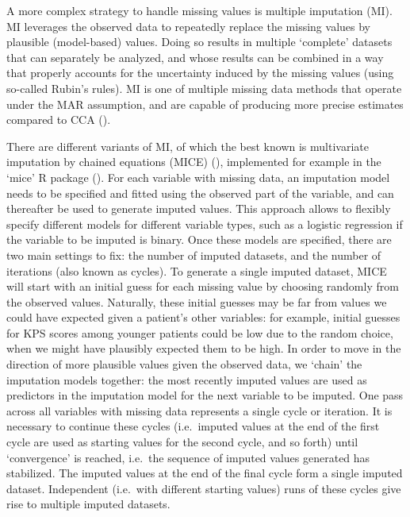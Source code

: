 \documentclass[
  letterpaper,
  paper=240mm:170mm,
  twoside=true,
  open=right,
  fontsize=10pt,
  pagesize=false,
  BCOR=15mm,
  DIV=14,
  headinclude=true,
  footinclude=false,
  headsepline=on]{scrbook}
\begin{document}
A more complex strategy to handle missing values is multiple imputation
(MI). MI leverages the observed data to repeatedly replace the missing
values by plausible (model-based) values. Doing so results in multiple
`complete' datasets that can separately be analyzed, and whose results
can be combined in a way that properly accounts for the uncertainty
induced by the missing values (using so-called Rubin's rules). MI is one
of multiple missing data methods that operate under the MAR assumption,
and are capable of producing more precise estimates compared to CCA
().

There are different variants of MI, of which the best known is
multivariate imputation by chained equations (MICE)
(), implemented for example in the `mice' R package
(). For each variable with missing data, an
imputation model needs to be specified and fitted using the observed
part of the variable, and can thereafter be used to generate imputed
values. This approach allows to flexibly specify different models for
different variable types, such as a logistic regression if the variable
to be imputed is binary. Once these models are specified, there are two
main settings to fix: the number of imputed datasets, and the number of
iterations (also known as cycles). To generate a single imputed dataset,
MICE will start with an initial guess for each missing value by choosing
randomly from the observed values. Naturally, these initial guesses may
be far from values we could have expected given a patient's other
variables: for example, initial guesses for KPS scores among younger
patients could be low due to the random choice, when we might have
plausibly expected them to be high. In order to move in the direction of
more plausible values given the observed data, we `chain' the imputation
models together: the most recently imputed values are used as predictors
in the imputation model for the next variable to be imputed. One pass
across all variables with missing data represents a single cycle or
iteration. It is necessary to continue these cycles (i.e.~imputed values
at the end of the first cycle are used as starting values for the second
cycle, and so forth) until `convergence' is reached, i.e.~the sequence
of imputed values generated has stabilized. The imputed values at the
end of the final cycle form a single imputed dataset. Independent
(i.e.~with different starting values) runs of these cycles give rise to
multiple imputed datasets.
\end{document}
